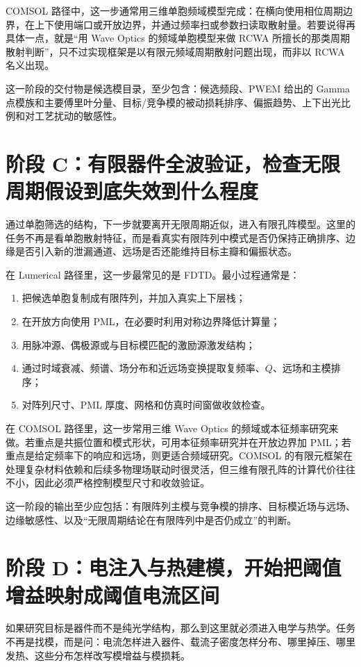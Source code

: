 COMSOL 路径中，这一步通常用三维单胞频域模型完成：在横向使用相位周期边界，在上下使用端口或开放边界，并通过频率扫或参数扫读取散射量。若要说得再具体一点，就是“用 Wave Optics 的频域单胞模型来做 RCWA 所擅长的那类周期散射判断”，只不过实现框架是以有限元频域周期散射问题出现，而非以 RCWA 名义出现。

这一阶段的交付物是候选模目录，至少包含：候选频段、PWEM 给出的 Gamma 点模族和主要傅里叶分量、目标/竞争模的被动损耗排序、偏振趋势、上下出光比例和对工艺扰动的敏感性。

\section{阶段 C：有限器件全波验证，检查无限周期假设到底失效到什么程度}
通过单胞筛选的结构，下一步就要离开无限周期近似，进入有限孔阵模型。这里的任务不再是看单胞散射特征，而是看真实有限阵列中模式是否仍保持正确排序、边缘是否引入新的泄漏通道、远场是否还能维持目标主瓣和偏振状态。

在 Lumerical 路径里，这一步最常见的是 FDTD。最小过程通常是：
\begin{enumerate}
  \item 把候选单胞复制成有限阵列，并加入真实上下层栈；
  \item 在开放方向使用 PML，在必要时利用对称边界降低计算量；
  \item 用脉冲源、偶极源或与目标模匹配的激励源激发结构；
  \item 通过时域衰减、频谱、场分布和近远场变换提取复频率、$Q$、远场和主模排序；
  \item 对阵列尺寸、PML 厚度、网格和仿真时间窗做收敛检查。
\end{enumerate}

在 COMSOL 路径里，这一步常用三维 Wave Optics 的频域或本征频率研究来做。若重点是共振位置和模式形状，可用本征频率研究并在开放边界加 PML；若重点是给定频率下的响应和远场，则更适合频域研究。COMSOL 的有限元框架在处理复杂材料依赖和后续多物理场联动时很灵活，但三维有限孔阵的计算代价往往不小，因此必须严格控制模型尺寸和收敛验证。

这一阶段的输出至少应包括：有限阵列主模与竞争模的排序、目标模近场与远场、边缘敏感性、以及“无限周期结论在有限阵列中是否仍成立”的判断。

\section{阶段 D：电注入与热建模，开始把阈值增益映射成阈值电流区间}
如果研究目标是器件而不是纯光学结构，那么到这里就必须进入电学与热学。任务不再是找模，而是问：电流怎样进入器件、载流子密度怎样分布、哪里掉压、哪里发热、这些分布怎样改写模增益与模损耗。

